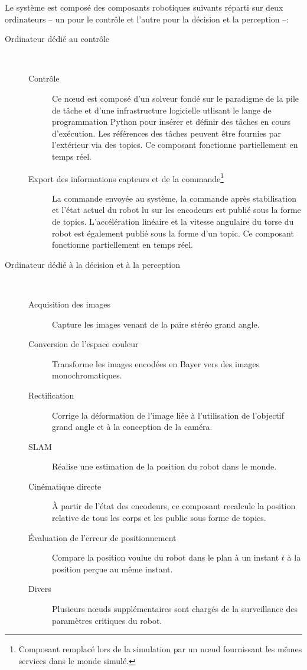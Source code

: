 Le système est composé des composants robotiques suivants réparti sur
deux ordinateurs -- un pour le contrôle et l'autre pour la décision et
la perception --:
\begin{description}
\item[Ordinateur dédié au contrôle]
  ~\\
  \begin{description}
  \item[Contrôle] Ce n\oe ud est composé d'un solveur fondé sur le
    paradigme de la pile de tâche et d'une infrastructure logicielle
    utlisant le lange de programmation Python pour insérer et définir
    des tâches en cours d'exécution. Les références des tâches peuvent
    être fournies par l'extérieur via des topics. Ce composant fonctionne
    partiellement en temps réel.
  \item[Export des informations capteurs et de la
    commande\footnote{Composant remplacé lors de la simulation par un
      n\oe ud fournissant les mêmes services dans le monde
      simulé.}\addtocounter{footnote}{-1}\addtocounter{Hfootnote}{-1}]
    La commande envoyée au système, la commande après stabilisation et
    l'état actuel du robot lu sur les encodeurs est publié sous la
    forme de topics. L'accélération linéaire et la vitesse angulaire
    du torse du robot est également publié sous la forme d'un
    topic. Ce composant fonctionne partiellement en temps réel.
  \end{description}

\item[Ordinateur dédié à la décision et à la perception]
  ~\\
  \begin{description}
  \item[Acquisition des images\footnotemark] Capture les images venant de la paire
    stéréo grand angle.
  \item[Conversion de l'espace couleur] Transforme les images encodées
    en Bayer vers des images monochromatiques.
  \item[Rectification] Corrige la déformation de l'image liée à
    l'utilisation de l'objectif grand angle et à la conception de la
    caméra.
  \item[SLAM] Réalise une estimation de la position du robot dans le
    monde.
  \item[Cinématique directe] À partir de l'état des encodeurs, ce
    composant recalcule la position relative de tous les corps et les
    publie sous forme de topics.
  \item[Évaluation de l'erreur de positionnement] Compare la position
    voulue du robot dans le plan à un instant $t$ à la position perçue
    au même instant.
  \item[Divers] Plusieurs n\oe uds supplémentaires sont chargés de la
    surveillance des paramètres critiques du robot.
  \end{description}
\end{description}


